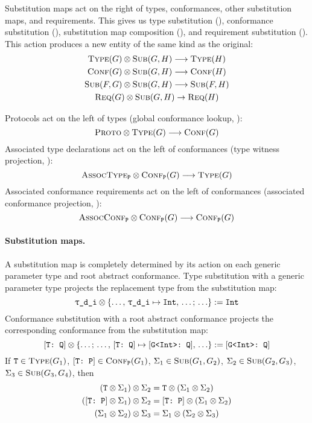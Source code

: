 \documentclass[../generics]{subfiles}
\begin{document}
Substitution maps act on the right of types, conformances, other substitution maps, and requirements. This gives us type substitution (), conformance substitution (), substitution map composition (), and requirement substitution (). This action produces a new entity of the same kind as the original:
\begin{gather*}
\textsc{Type}({G})\otimes\textsc{Sub}({G, H})\longrightarrow\textsc{Type}({H})\\
\textsc{Conf}({G})\otimes\textsc{Sub}({G, H})\longrightarrow\textsc{Conf}({H})\\
\textsc{Sub}({F, G})\otimes\textsc{Sub}({G, H})\longrightarrow\textsc{Sub}({F, H})\\
\textsc{Req}({G})\otimes\textsc{Sub}({G, H})\rightarrow\textsc{Req}({H})
\end{gather*}

Protocols act on the left of types (global conformance lookup, ):
\[\textsc{Proto}\otimes\textsc{Type}({G})\longrightarrow\textsc{Conf}({G})\]
Associated type declarations act on the left of conformances (type witness projection, ):
\[\textsc{AssocType}_{\texttt{P}}\otimes\textsc{Conf}_{\texttt{P}}({G})\longrightarrow\textsc{Type}({G})\]
Associated conformance requirements act on the left of conformances (associated conformance projection, ):
\[\textsc{AssocConf}_{\texttt{P}}\otimes\textsc{Conf}_{\texttt{P}}({G})\longrightarrow\textsc{Conf}_{\texttt{P}}({G})\]

\paragraph{Substitution maps.}
A substitution map is completely determined by its action on each generic parameter type and root abstract conformance. Type substitution with a generic parameter type projects the replacement type from the substitution map:
\[\texttt{$\uptau$\_d\_i} \otimes \{\ldots,\,\texttt{\texttt{$\uptau$\_d\_i}} \mapsto \texttt{Int},\,\ldots;\,\ldots\} := \texttt{Int}\]
Conformance substitution with a root abstract conformance projects the corresponding conformance from the substitution map:
\[
[\texttt{T:~Q}] \otimes \{\ldots;\,\ldots,\,[\texttt{T:~Q}] \mapsto [\texttt{G<Int>:~Q}],\,\ldots\} := [\texttt{G<Int>:~Q}]
\]
If $\texttt{T}\in\textsc{Type}({G_1})$, $[\texttt{T:~P}]\in\textsc{Conf}_{\texttt{P}}({G_1})$, $\Sigma_1\in\textsc{Sub}({G_1, G_2})$, $\Sigma_2\in\textsc{Sub}({G_2, G_3})$, $\Sigma_3\in\textsc{Sub}({G_3, G_4})$, then 
\begin{gather*}
(\texttt{T}\otimes \Sigma_1) \otimes \Sigma_2=\texttt{T}\otimes (\Sigma_1\otimes \Sigma_2)\\
([\texttt{T:~P}]\otimes \Sigma_1) \otimes \Sigma_2=[\texttt{T:~P}]\otimes (\Sigma_1\otimes \Sigma_2)\\
(\Sigma_1\otimes \Sigma_2) \otimes \Sigma_3=\Sigma_1\otimes(\Sigma_2\otimes \Sigma_3)
\end{gather*}
\end{document}
